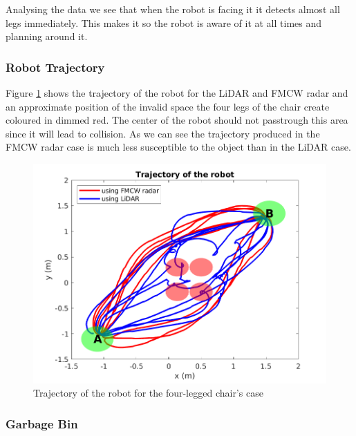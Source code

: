 Analysing the data we see that when the robot is facing it it detects almost all legs immediately. 
This makes it so the robot is aware of it at all times and planning around it.


\subsubsection*{Robot Trajectory}

Figure \ref{fig:traj2} shows the trajectory of the robot for the \ac{LiDAR} and \ac{FMCW} \ac{radar} and an approximate position of the invalid space the four legs of the chair create coloured in dimmed red. The center of the robot should not passtrough this area since it will lead to collision. As we can see the trajectory  produced in the \ac{FMCW} radar case is much less susceptible to the object than in the \ac{LiDAR} case. 
\begin{figure}[ht!]
\centerline{\includegraphics [width=0.7 \textwidth]{imgs/chapter5/traj2.png}}
\caption{Trajectory of the robot for the four-legged chair's case}
\label{fig:traj2}
\end{figure}

\subsubsection{Garbage Bin}

